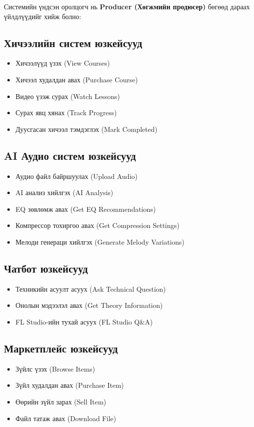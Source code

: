 Системийн үндсэн оролцогч нь \textbf{Producer (Хөгжмийн продюсер)} бөгөөд дараах үйлдлүүдийг хийж болно:

\subsection{Хичээлийн систем юзкейсууд}
\begin{itemize}
    \item Хичээлүүд үзэх (View Courses)
    \item Хичээл худалдан авах (Purchase Course)
    \item Видео үзэж сурах (Watch Lessons)
    \item Сурах явц хянах (Track Progress)
    \item Дуусгасан хичээл тэмдэглэх (Mark Completed)
\end{itemize}

\subsection{AI Аудио систем юзкейсууд}
\begin{itemize}
    \item Аудио файл байршуулах (Upload Audio)
    \item AI анализ хийлгэх (AI Analysis)
    \item EQ зөвлөмж авах (Get EQ Recommendations)
    \item Компрессор тохиргоо авах (Get Compression Settings)
    \item Мелоди генераци хийлгэх (Generate Melody Variations)
\end{itemize}

\subsection{Чатбот юзкейсууд}
\begin{itemize}
    \item Техникийн асуулт асуух (Ask Technical Question)
    \item Онолын мэдээлэл авах (Get Theory Information)
    \item FL Studio-ийн тухай асуух (FL Studio Q\&A)
\end{itemize}

\subsection{Маркетплейс юзкейсууд}
\begin{itemize}
    \item Зүйлс үзэх (Browse Items)
    \item Зүйл худалдан авах (Purchase Item)
    \item Өөрийн зүйл зарах (Sell Item)
    \item Файл татаж авах (Download File)
\end{itemize}


